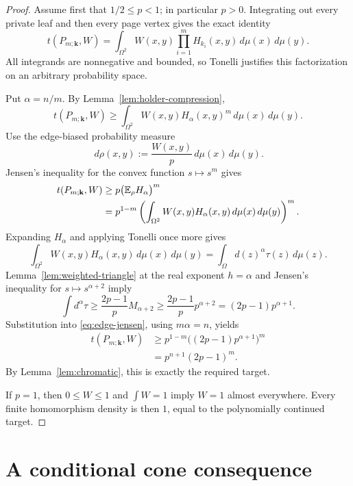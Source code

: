 \documentclass[11pt]{article}
\newcommand{\dd}{\,d}
\begin{document}
\begin{proof}
Assume first that $1/2\leq p<1$; in particular $p>0$.  Integrating
out every private leaf and then every page vertex gives the exact
identity
\begin{equation}
 t(P_{m;\mathbf{k}},W)
 =\int_{\Omega^2}W(x,y)
   \prod_{i=1}^m H_{k_i}(x,y)
   \dd\mu(x)\dd\mu(y).
 \label{eq:density-identity}
\end{equation}
All integrands are nonnegative and bounded, so Tonelli justifies this
factorization on an arbitrary probability space.

Put $\alpha=n/m$.  By Lemma~\ref{lem:holder-compression},
\[
 t(P_{m;\mathbf{k}},W)
 \geq\int_{\Omega^2}W(x,y)H_\alpha(x,y)^m
 \dd\mu(x)\dd\mu(y).
\]
Use the edge-biased probability measure
\[
 \dd\rho(x,y):=\frac{W(x,y)}p
 \dd\mu(x)\dd\mu(y).
\]
Jensen's inequality for the convex function $s\mapsto s^m$ gives
\begin{align}
 t(P_{m;\mathbf{k}},W)
 &\geq p\bigl(\mathbb E_\rho H_\alpha\bigr)^m
 \notag\\
 &=p^{1-m}
 \left(\int_{\Omega^2}W(x,y)H_\alpha(x,y)
 \dd\mu(x)\dd\mu(y)\right)^m.
 \label{eq:edge-jensen}
\end{align}
Expanding $H_\alpha$ and applying Tonelli once more gives
\[
 \int_{\Omega^2}W(x,y)H_\alpha(x,y)\dd\mu(x)\dd\mu(y)
 =\int_\Omega d(z)^\alpha\tau(z)\dd\mu(z).
\]
Lemma~\ref{lem:weighted-triangle} at the real exponent $h=\alpha$
and Jensen's inequality for $s\mapsto s^{\alpha+2}$ imply
\[
 \int d^\alpha\tau
 \geq\frac{2p-1}{p}M_{\alpha+2}
 \geq\frac{2p-1}{p}p^{\alpha+2}
 =(2p-1)p^{\alpha+1}.
\]
Substitution into \eqref{eq:edge-jensen}, using $m\alpha=n$, yields
\begin{align*}
 t(P_{m;\mathbf{k}},W)
 &\geq p^{1-m}
 \bigl((2p-1)p^{\alpha+1}\bigr)^m
 \\
 &=p^{n+1}(2p-1)^m.
\end{align*}
By Lemma~\ref{lem:chromatic}, this is exactly the required target.

If $p=1$, then $0\leq W\leq1$ and $\int W=1$ imply
$W=1$ almost everywhere.  Every finite homomorphism density is then
$1$, equal to the polynomially continued target.
\end{proof}


\section{A conditional cone consequence}
\end{document}
